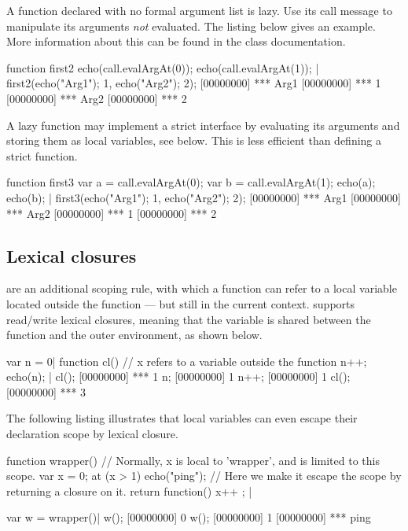 A function declared with no formal argument list is lazy.  Use its call
message to manipulate its arguments \emph{not} evaluated.  The listing below
gives an example.  More information about this can be found in the
 class documentation.

\begin{urbiscript}
function first2
{
  echo(call.evalArgAt(0));
  echo(call.evalArgAt(1));
}|
first2({echo("Arg1"); 1},
       {echo("Arg2"); 2});
[00000000] *** Arg1
[00000000] *** 1
[00000000] *** Arg2
[00000000] *** 2
\end{urbiscript}

A lazy function may implement a strict interface by evaluating its
arguments and storing them as local variables, see below.  This is
less efficient than defining a strict function.

\begin{urbiscript}
function first3
{
  var a = call.evalArgAt(0);
  var b = call.evalArgAt(1);
  echo(a); echo(b);
}|
first3({echo("Arg1"); 1},
       {echo("Arg2"); 2});
[00000000] *** Arg1
[00000000] *** Arg2
[00000000] *** 1
[00000000] *** 2
\end{urbiscript}

\subsection{Lexical closures}
\label{sec:us-fun-closures}

 are an additional scoping rule, with which a function
can refer to a local variable located outside the function --- but still
in the current context. \us supports read/write lexical closures,
meaning that the variable is shared between the function and the outer
environment, as shown below.

\begin{urbiscript}
var n = 0|
function cl()
{
  // x refers to a variable outside the function
  n++;
  echo(n);
}|
cl();
[00000000] *** 1
n;
[00000000] 1
n++;
[00000000] 1
cl();
[00000000] *** 3
\end{urbiscript}

The following listing illustrates that local variables can even escape their
declaration scope by lexical closure.

\begin{urbiscript}
function wrapper()
{
  // Normally, x is local to 'wrapper', and is limited to this scope.
  var x = 0;
  at (x > 1)
    echo("ping");
  // Here we make it escape the scope by returning a closure on it.
  return function() { x++ };
} |

var w = wrapper()|
w();
[00000000] 0
w();
[00000000] 1
[00000000] *** ping
\end{urbiscript}


